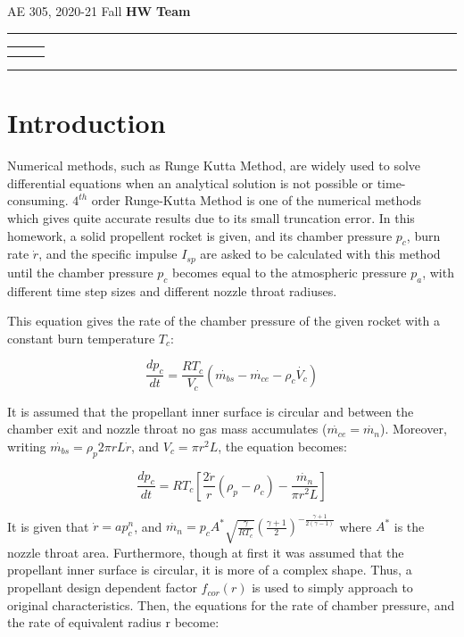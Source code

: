 \documentclass[letterpaper,12pt]{article}
\begin{document}
\begin{center}
AE 305, 2020-21 Fall \hfill \textbf{HW \HWno} \hfill \textbf{Team \TeamNo} \\
\noindent\rule{\textwidth}{0.4pt}
\begin{tabular}{p{} | p{} | p{} }
	\AuthorOneName&\AuthorTwoName&\AuthorThreeName\\
	\textit{\AuthorOneID}&\textit{\AuthorTwoID}&\textit{\AuthorThreeID}
\end{tabular}
\noindent\rule{\textwidth}{0.4pt}
\end{center}


\section{Introduction}

Numerical methods, such as Runge Kutta Method, are widely used to solve differential equations when an
analytical solution is not possible or time-consuming. $4^{th}$ order Runge-Kutta Method is one of the
numerical methods which gives quite accurate results due to its small truncation error. In this homework,
a solid propellent rocket is given, and its chamber pressure $p_c$, burn rate $\dot{r}$, and the specific
impulse $I_{sp}$ are asked to be calculated with this method until the chamber pressure $p_c$ becomes equal 
to the atmospheric pressure $p_a$, with different time step sizes and different nozzle throat radiuses.

This equation gives the rate of the chamber pressure of the given rocket with a constant burn temperature
$T_c$:

\begin{equation}
	\frac{dp_c}{dt} = \frac{RT_c}{V_c}(\dot{m_{bs}} - \dot{m_{ce}} - \rho_{c}\dot{V_c})
\end{equation}

It is assumed that the propellant inner surface is circular and between the chamber exit and nozzle throat
no gas mass accumulates ($\dot{m_{ce}} = \dot{m_n}$). Moreover, writing $\dot{m_{bs}} = \rho_{p}2\pi rL\dot{r}$,
and $V_c = \pi r^{2}L$, the equation becomes:

\begin{equation}
	\frac{dp_c}{dt} = RT_c[\frac{2\dot{r}}{r}(\rho_{p} - \rho_{c}) - \frac{\dot{m_n}}{\pi r^{2}L}]
\end{equation}

It is given that $\dot{r} = ap_c^{n}$, and $\dot{m_n} = p_cA^{*}\sqrt{\frac{\gamma}{RT_c}}(\frac{\gamma +1}{2})^{-\frac{\gamma +1}{2(\gamma -1)}}$
where $A^{*}$ is the nozzle throat area. Furthermore, though at first it was assumed that the propellant 
inner surface is circular, it is more of a complex shape. Thus, a propellant design dependent factor
$f_{cor}(r)$ is used to simply approach to original characteristics. Then, the equations for the rate
of chamber pressure, and the rate of equivalent radius r become:
\end{document}
